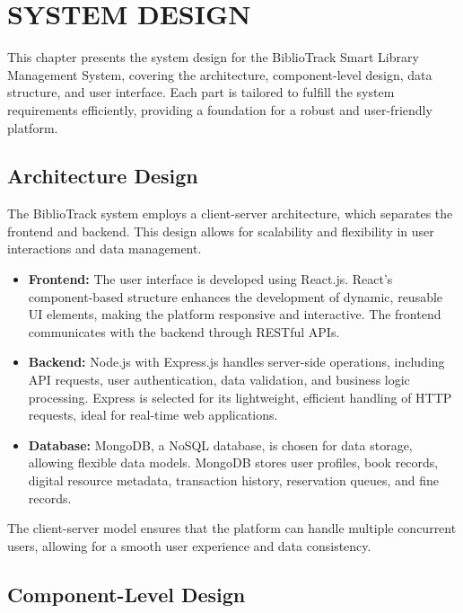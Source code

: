 \documentclass[12pt,a4paper]{report}
\begin{document}
\chapter{SYSTEM DESIGN}

This chapter presents the system design for the BiblioTrack Smart Library Management System, covering the architecture, component-level design, data structure, and user interface. Each part is tailored to fulfill the system requirements efficiently, providing a foundation for a robust and user-friendly platform.

\section{Architecture Design}
\label{sec:architecturedesign}

The BiblioTrack system employs a client-server architecture, which separates the frontend and backend. This design allows for scalability and flexibility in user interactions and data management.

\begin{itemize}
    \item \textbf{Frontend:} The user interface is developed using React.js. React's component-based structure enhances the development of dynamic, reusable UI elements, making the platform responsive and interactive. The frontend communicates with the backend through RESTful APIs.
    
    \item \textbf{Backend:} Node.js with Express.js handles server-side operations, including API requests, user authentication, data validation, and business logic processing. Express is selected for its lightweight, efficient handling of HTTP requests, ideal for real-time web applications.
    
    \item \textbf{Database:} MongoDB, a NoSQL database, is chosen for data storage, allowing flexible data models. MongoDB stores user profiles, book records, digital resource metadata, transaction history, reservation queues, and fine records.
\end{itemize}

The client-server model ensures that the platform can handle multiple concurrent users, allowing for a smooth user experience and data consistency.

\section{Component-Level Design}
\label{sec:componentdesign}
\end{document}
